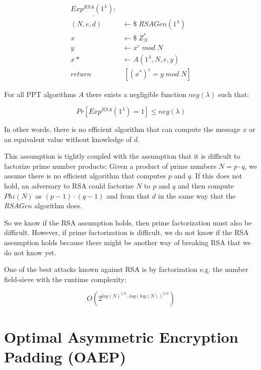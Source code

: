 \begin{align*}
    \underline{Exp^{RSA}(1^\lambda):} &                                  \\
    (N,e,d)                           & \leftarrow\$ \;RSAGen(1^\lambda) \\
    x                                 & \leftarrow\$ \;Z_N^*             \\
    y                                 & \leftarrow x^e \; mod \; N       \\
    x*                                & \leftarrow A(1^\lambda, N, e, y) \\
    return                            & \; [(x^*)^e = y \; mod \; N]
\end{align*}

For all PPT algorithms $A$ there exists a negligible function $neg(\lambda)$ such that:

$$
    Pr[Exp^{RSA}(1^\lambda) = 1] \leq neg(\lambda)
$$

In other words, there is no efficient algorithm that can compute the message $x$ or an equivalent value without knowledge of $d$.

This assumption is tightly coupled with the assumption that it is difficult to factorize prime number products:
Given a product of prime numbers $N = p \cdot q$, we assume there is no efficient algorithm that computes $p$ and $q$.
If this does not hold, an adversary to RSA could factorize $N$ to $p$ and $q$ and then compute $Phi(N)$ as $(p-1) \cdot (q-1)$ and from that $d$ in the same way that the $RSAGen$ algorithm does.

So we know if the RSA assumption holds, then prime factorization must also be difficult.
However, if prime factorization is difficult, we do not know if the RSA assumption holds because there might be another way of breaking RSA that we do not know yet.

One of the best attacks known against RSA is by factorization e.g. the number field-sieve with the runtime complexity:

$$
O(2^{log(N)^{1/3} \cdot log(log(N))^{2/3}})
$$


\section{Optimal Asymmetric Encryption Padding (OAEP)}\label{sec:oaep}

